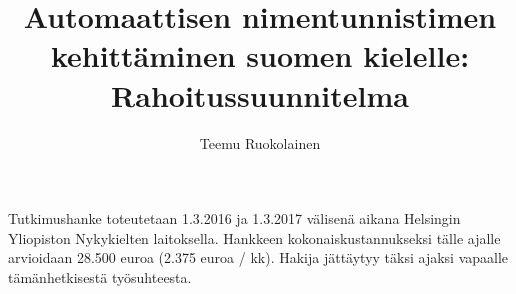 \documentclass[12pt,a4paper,finnish,oneside]{article}
\begin{document}
\title{Automaattisen nimentunnistimen kehittäminen suomen kielelle: Rahoitussuunnitelma}
\author{Teemu Ruokolainen}


\maketitle

Tutkimushanke toteutetaan 1.3.2016 ja 1.3.2017 välisenä aikana Helsingin Yliopiston Nykykielten laitoksella. Hankkeen kokonaiskustannukseksi tälle ajalle arvioidaan 28.500 euroa (2.375 euroa / kk). Hakija jättäytyy täksi ajaksi vapaalle tämänhetkisestä työsuhteesta.






\end{document}
